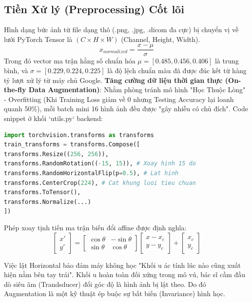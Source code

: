 \documentclass[conference,a4paper]{IEEEtran}
\begin{document}
\subsection{Tiền Xử lý (Preprocessing) Cốt lõi}
Hình dạng bức ảnh từ file dạng thô (.png, .jpg, .dicom đa cực) bị chuyển vị về lưới PyTorch Tensor là $(C \times H \times W)$ (Channel, Height, Width).
\begin{equation}
x_{normalized} = \frac{x - \mu}{\sigma}
\end{equation}
Trong đó vector ma trận hằng số chuẩn hóa $\mu = [0.485, 0.456, 0.406]$ là trung bình, và $\sigma = [0.229, 0.224, 0.225]$ là độ lệch chuẩn màu đã được đúc kết từ hàng tỷ lượt xử lý từ máy chủ Google.
\textbf{Tăng cường dữ liệu thời gian thực (On-the-fly Data Augmentation)}:
Nhằm phòng tránh mô hình "Học Thuộc Lòng" - Overfitting (Khi Training Loss giảm về 0 nhưng Testing Accuracy lại loanh quanh 50\%), mỗi batch mini 16 hình ảnh đều được "gây nhiễu có chủ đích". Code snippet ở khối `utils.py` backend:
\begin{lstlisting}[language=Python]
import torchvision.transforms as transforms
train_transforms = transforms.Compose([
transforms.Resize((256, 256)),
transforms.RandomRotation((-15, 15)), # Xoay hinh 15 do
transforms.RandomHorizontalFlip(p=0.5), # Lat hinh
transforms.CenterCrop(224), # Cat khung luoi tieu chuan
transforms.ToTensor(),
transforms.Normalize(...)
])
\end{lstlisting}

Phép xoay tịnh tiến ma trận biến đổi affine được định nghĩa:
\begin{equation}
\begin{bmatrix} x' \\ y' \end{bmatrix} =
\begin{bmatrix} \cos\theta & -\sin\theta \\ \sin\theta & \cos\theta \end{bmatrix}
\begin{bmatrix} x - x_c \\ y - y_c \end{bmatrix} + \begin{bmatrix} x_c \\ y_c \end{bmatrix}
\end{equation}

Việc lật Horizontal bảo đảm máy không học "Khối u ác tính lúc nào cũng xuất hiện nằm bên tay trái". Khối u hoàn toàn đối xứng trong mô vú, bác sĩ cầm đầu dò siêu âm (Trandsducer) đổi góc độ là hình ảnh bị lật theo. Do đó Augmentation là một kỹ thuật ép buộc sự bất biến (Invariance) hình học.
\end{document}
